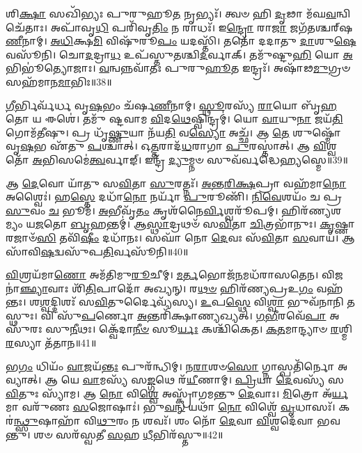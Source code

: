 𑌶𑌿\-\ul{𑌕𑍍𑌷𑌾} 𑌸𑌖𑌿᳴𑌭𑍍𑌯𑌃 𑌪𑍁𑌰𑍁𑌹𑍂\-\ul{𑌤} 𑌨𑍃𑌭𑍍𑌯𑌃᳴।
𑌤𑍍𑌵𑍞 𑌹𑌿 \ul{𑌦𑍃}\-𑌢𑌾 𑌮᳴𑌘\-\ul{𑌵}\-𑌨𑍍𑌵𑌿𑌚𑍇᳴𑌤𑌾𑌃।
𑌅𑌪𑌾᳴𑌵𑍃\-\ul{𑌧𑌿} 𑌪𑌰𑌿᳴𑌵𑍃\-\ul{𑌤𑌿𑌂} 𑌨 𑌰𑌾𑌧𑌃᳴।
𑌇\-\ul{𑌨𑍍𑌦𑍍𑌰𑍋} 𑌰𑌾\-\ul{𑌜𑌾} 𑌜𑌗᳴𑌤𑌶𑍍𑌚𑌰𑍍‌\mbox{}𑌷\-\ul{𑌣𑍀}\-𑌨𑌾𑌮𑍍।
\-\ul{𑌅}\-\-\ul{𑌧𑌿}\-𑌕𑍍𑌷\-\ul{𑌮𑌿} 𑌵𑌿𑌷𑍁᳴𑌰𑍂\-\ul{𑌪𑌂} 𑌯𑌦𑌸𑍍𑌤𑌿᳴।
𑌤𑌤𑍋᳴ 𑌦𑌦𑌾𑌤𑍁 \ul{𑌦𑌾}\-𑌶𑍁\-\ul{𑌷𑍇} 𑌵𑌸𑍂᳴𑌨𑌿।
𑌚𑍋\-\ul{𑌦}\-𑌦𑍍𑌰𑌾\-\ul{𑌧} 𑌉𑌪᳴𑌸𑍍𑌤𑍁𑌤𑌶𑍍𑌚𑌿\-\ul{𑌦}\-𑌰𑍍𑌵𑌾𑌕𑍍।
𑌤𑌮𑍁᳴𑌷𑍍𑌟𑍁\-\ul{𑌹𑌿} 𑌯𑍋 \ul{𑌅}\-𑌭𑌿𑌭𑍂॑𑌤𑍍𑌯𑍋𑌜𑌾𑌃।
\-\ul{𑌵}\-𑌨𑍍𑌵𑌨𑍍𑌨𑌵𑌾᳴𑌤𑌃 𑌪𑍁𑌰𑍁\-\ul{𑌹𑍂}\-𑌤 𑌇𑌨𑍍𑌦𑍍𑌰𑌃᳴।
𑌅𑌷𑌾᳴𑌢\-\ul{𑌮𑍁}\-𑌗𑍍𑌰𑍞 𑌸𑌹᳴𑌮𑌾𑌨\-\ul{𑌮𑌾}\-𑌭𑌿𑌃॥38॥

\-\ul{𑌗𑍀}\-𑌰𑍍𑌭𑌿𑌰𑍍𑌵᳴𑌰𑍍𑌧 𑌵𑍃\-\ul{𑌷}\-𑌭𑌂 𑌚᳴𑌰𑍍\mbox{}𑌷\-\ul{𑌣𑍀}\-𑌨𑌾𑌮𑍍।
\-\ul{𑌸𑍍𑌥𑍂}\-𑌰𑌸𑍍𑌯᳴ \ul{𑌰𑌾}\-𑌯𑍋 𑌬𑍃᳴\-\ul{𑌹}\-𑌤𑍋 𑌯 𑌈𑌶𑍇॑।
𑌤𑌮𑍁᳴ 𑌷𑍍𑌟𑌵𑌾𑌮 \ul{𑌵𑌿}\-𑌦\-\ul{𑌥𑍇}\-𑌷𑍍𑌵𑌿𑌨𑍍𑌦𑍍𑌰𑌮𑍍॑।
𑌯𑍋 \ul{𑌵𑌾}\-𑌯𑍁\-\ul{𑌨𑌾} 𑌜𑌯᳴\-\ul{𑌤𑌿} 𑌗𑍋𑌮᳴𑌤𑍀𑌷𑍁।
𑌪𑍍𑌰 𑌧𑍃᳴\-\ul{𑌷𑍍𑌣𑍁}\-𑌯𑌾 𑌨᳴𑌯\-\ul{𑌤𑌿} 𑌵\-\ul{𑌸𑍍𑌯𑍋} 𑌅𑌚𑍍𑌛᳴।
𑌆 \ul{𑌤𑍇} 𑌶𑍁𑌷𑍍𑌮𑍋᳴ 𑌵𑍃\-\ul{𑌷}\-𑌭 𑌏᳴𑌤𑍁 \ul{𑌪}\-𑌶𑍍𑌚𑌾𑌤𑍍।
𑌓\-\ul{𑌤𑍍𑌤}\-𑌰𑌾𑌦᳴\-\ul{𑌧}\-𑌰𑌾𑌗𑌾 \ul{𑌪𑍁}\-𑌰𑌸𑍍𑌤𑌾॑𑌤𑍍।
𑌆 \ul{𑌵𑌿}\-𑌶𑍍𑌵𑌤𑍋᳴ \ul{𑌅}\-𑌭𑌿𑌸𑌮𑍇॑\-\ul{𑌤𑍍𑌵}\-𑌰𑍍𑌵𑌾𑌙𑍍।
𑌇𑌨𑍍𑌦𑍍𑌰᳴ \ul{𑌦𑍍𑌯𑍁}\-𑌮𑍍𑌨𑍞 𑌸𑍁𑌵᳴𑌰𑍍𑌵𑌦𑍍𑌧𑍇\-\ul{𑌹𑍍𑌯}\-𑌸𑍍𑌮𑍇॥39॥\anuvakamend[\-\ul{𑌵}\-𑌰𑌾𑌹𑍈॑\-\ul{𑌰𑍍𑌵𑌿}\-𑌶𑍍𑌵𑌹𑌾᳴\-𑌽𑌜𑌨𑌿𑌷𑍍𑌟 \ul{𑌪𑍂}\-𑌷𑍋𑌦𑍍𑌵𑌰𑍀᳴𑌵𑍃𑌜\-\ul{𑌤𑍍𑌖𑌾}\-𑌦𑌯𑍋᳴ 𑌵𑌃 \ul{𑌪𑌾}\-𑌨𑍍𑌤𑍍𑌯\-\ul{𑌸𑍍𑌤𑍍𑌯𑌾}\-𑌭𑌿𑌰𑍍𑌨𑌵᳴ 𑌚]

𑌆 \ul{𑌦𑍇}\-𑌵𑍋 𑌯𑌾᳴𑌤𑍁 𑌸\-\ul{𑌵𑌿}\-𑌤𑌾 \ul{𑌸𑍁}\-𑌰𑌤𑍍𑌨𑌃᳴।
\-\ul{𑌅}\-\-\ul{𑌨𑍍𑌤}\-\-\ul{𑌰𑌿}\-\-\ul{𑌕𑍍𑌷}\-𑌪𑍍𑌰𑌾 𑌵𑌹᳴𑌮𑌾\-\ul{𑌨𑍋} 𑌅𑌶𑍍𑌵𑍈𑌃॑।
𑌹\-\ul{𑌸𑍍𑌤𑍇} 𑌦𑌧𑌾᳴\-\ul{𑌨𑍋} 𑌨𑌰𑍍𑌯𑌾᳴ \ul{𑌪𑍁}\-𑌰𑍂𑌣𑌿᳴।
\-\ul{𑌨𑌿}\-\-\ul{𑌵𑍇}\-𑌶𑌯𑌂᳴ 𑌚 𑌪𑍍𑌰\-\ul{𑌸𑍁}\-𑌵𑌂 \ul{𑌚} 𑌭𑍂𑌮᳴।
\-\ul{𑌅}\-𑌭𑍀𑌵𑍃᳴\-\ul{𑌤𑌂} 𑌕𑍃𑌶᳴𑌨𑍈\-\ul{𑌰𑍍𑌵𑌿}\-𑌶𑍍𑌵𑌰𑍂᳴𑌪𑌮𑍍।
𑌹𑌿𑌰᳴𑌣𑍍𑌯𑌶𑌮𑍍𑌯𑌂 𑌯\-\ul{𑌜}\-𑌤𑍋 \ul{𑌬𑍃}\-𑌹𑌨𑍍𑌤𑌮𑍍॑।
𑌆\-\ul{𑌸𑍍𑌥𑌾}\-𑌦𑍍𑌰𑌥𑍞᳴ 𑌸\-\ul{𑌵𑌿}\-𑌤𑌾 \ul{𑌚𑌿}\-𑌤𑍍𑌰𑌭𑌾᳴𑌨𑍁𑌃।
\-\ul{𑌕𑍃}\-𑌷𑍍𑌣𑌾 𑌰𑌜𑌾𑍞᳴\-\ul{𑌸𑌿} 𑌤𑌵𑌿᳴\-\ul{𑌷𑍀𑌂} 𑌦𑌧𑌾᳴𑌨𑌃।
𑌸𑌘𑌾᳴ 𑌨𑍋 \ul{𑌦𑍇}\-𑌵𑌃 𑌸᳴\-\ul{𑌵𑌿}\-𑌤𑌾 \ul{𑌸}\-𑌵𑌾𑌯᳴।
𑌆 𑌸𑌾᳴𑌵𑌿\-\ul{𑌷}\-𑌦𑍍𑌵𑌸𑍁᳴𑌪\-\ul{𑌤𑌿}\-𑌰𑍍𑌵𑌸𑍂᳴𑌨𑌿॥40॥

\-\ul{𑌵𑌿}\-𑌶𑍍𑌰𑌯᳴𑌮𑌾\-\ul{𑌣𑍋} 𑌅𑌮᳴𑌤𑌿𑌮𑍁\-\ul{𑌰𑍂}\-𑌚𑍀𑌮𑍍।
\-\ul{𑌮}\-\-\ul{𑌰𑍍𑌤}\-𑌭𑍋𑌜᳴\-\ul{𑌨}\-𑌮𑌧᳴𑌰𑌾𑌸𑌤𑍇𑌨।
𑌵𑌿𑌜𑌨𑌾॑\-\ul{𑌞𑍍𑌛𑍍𑌯𑌾}\-𑌵𑌾𑌃 𑌶𑌿᳴\-\ul{𑌤𑌿}\-𑌪𑌾𑌦𑍋᳴ 𑌅𑌖𑍍𑌯𑌨𑍍।
𑌰\-\ul{𑌥}\-\-\ul{𑍞} 𑌹𑌿𑌰᳴𑌣𑍍𑌯𑌪𑍍𑌰𑌉\-\ul{𑌗𑌂} 𑌵𑌹᳴𑌨𑍍𑌤𑌃।
𑌶\-\ul{𑌶𑍍𑌵}\-𑌦𑍍𑌦𑌿𑌶𑌃᳴ 𑌸\-\ul{𑌵𑌿}\-𑌤𑍁𑌰𑍍𑌦𑍈𑌵𑍍𑌯᳴𑌸𑍍𑌯।
\-\ul{𑌉}\-𑌪\-\ul{𑌸𑍍𑌥𑍇} 𑌵𑌿\-\ul{𑌶𑍍𑌵𑌾} 𑌭𑍁𑌵᳴𑌨𑌾𑌨𑌿 𑌤𑌸𑍍𑌥𑍁𑌃।
𑌵𑌿 𑌸𑍁᳴\-\ul{𑌪}\-𑌰𑍍𑌣𑍋 \ul{𑌅}\-𑌨𑍍𑌤𑌰𑌿᳴𑌕𑍍𑌷𑌾𑌣𑍍𑌯𑌖𑍍𑌯𑌤𑍍।
\-\ul{𑌗}\-\-\ul{𑌭𑍀}\-𑌰𑌵𑍇᳴\-\ul{𑌪𑌾} 𑌅𑌸𑍁᳴𑌰𑌃 𑌸𑍁\-\ul{𑌨𑍀}\-𑌥𑌃।
𑌕𑍍𑌵𑍇᳴𑌦𑌾\-\ul{𑌨𑍀}\-\-\ul{𑍞} 𑌸𑍂\-\ul{𑌰𑍍𑌯𑌃} 𑌕𑌶𑍍𑌚𑌿᳴𑌕𑍇𑌤।
\-\ul{𑌕}\-\-\ul{𑌤}\-𑌮𑌾𑌨𑍍𑌦𑍍𑌯𑌾𑍞 \ul{𑌰}\-𑌶𑍍𑌮𑌿\-\ul{𑌰}\-𑌸𑍍𑌯𑌾 𑌤᳴𑌤𑌾𑌨॥41॥

𑌭\-\ul{𑌗𑌂} 𑌧𑌿𑌯𑌂᳴ \ul{𑌵𑌾}\-𑌜𑌯᳴\-\ul{𑌨𑍍𑌤𑌃} 𑌪𑍁𑌰᳴𑌨𑍍𑌧𑌿𑌮𑍍।
𑌨\-\ul{𑌰𑌾}\-𑌶𑍞\-\ul{𑌸𑍋} 𑌗𑍍𑌨𑌾𑌸𑍍𑌪𑌤𑌿᳴𑌰𑍍𑌨𑍋 𑌅𑌵𑍍𑌯𑌾𑌤𑍍।
𑌆 𑌯𑍇 \ul{𑌵𑌾}\-𑌮𑌸𑍍𑌯᳴ 𑌸\-\ul{𑌙𑍍𑌗}\-𑌥𑍇 𑌰᳴\-\ul{𑌯𑍀}\-𑌣𑌾𑌮𑍍।
\-\ul{𑌪𑍍𑌰𑌿}\-𑌯𑌾 \ul{𑌦𑍇}\-𑌵𑌸𑍍𑌯᳴ 𑌸\-\ul{𑌵𑌿}\-𑌤𑍁𑌃 𑌸𑍍𑌯𑌾᳴𑌮।
𑌆 \ul{𑌨𑍋} 𑌵𑌿\-\ul{𑌶𑍍𑌵𑍇} 𑌅𑌸𑍍𑌕𑍍𑌰𑌾᳴𑌗𑌮𑌨𑍍𑌤𑍁 \ul{𑌦𑍇}\-𑌵𑌾𑌃।
\-\ul{𑌮𑌿}\-𑌤𑍍𑌰𑍋 𑌅᳴\-\ul{𑌰𑍍𑌯}\-𑌮𑌾 𑌵𑌰𑍁᳴𑌣𑌃 \ul{𑌸}\-𑌜𑍋𑌷𑌾𑌃॑।
𑌭𑍁\-\ul{𑌵}\-\-\ul{𑌨𑍍} 𑌯𑌥𑌾᳴ \ul{𑌨𑍋} 𑌵𑌿𑌶𑍍𑌵𑍇᳴ \ul{𑌵𑍃}\-𑌧𑌾𑌸𑌃᳴।
𑌕𑌰॑\-\ul{𑌨𑍍𑌥𑍍𑌸𑍁}\-𑌷𑌾𑌹𑌾᳴ 𑌵𑌿\-\ul{𑌥𑍁}\-𑌰𑌂 𑌨 𑌶𑌵𑌃᳴।
𑌶𑌂 𑌨𑍋᳴ \ul{𑌦𑍇}\-𑌵𑌾 \ul{𑌵𑌿}\-𑌶𑍍𑌵𑌦𑍇᳴𑌵𑌾 𑌭𑌵𑌨𑍍𑌤𑍁।
𑌶𑍞 𑌸𑌰᳴𑌸𑍍𑌵𑌤𑍀 \ul{𑌸}\-𑌹 \ul{𑌧𑍀}\-𑌭𑌿𑌰᳴𑌸𑍍𑌤𑍁॥42॥

